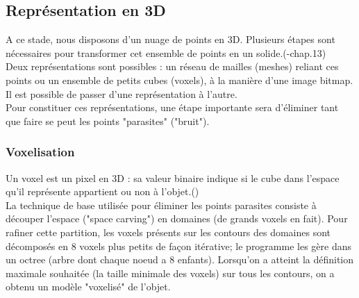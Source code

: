 \documentclass[a4paper,10pt]{report}
\begin{document}
\subsection{Représentation en 3D}
A ce stade, nous disposons d'un nuage de points en 3D. Plusieurs étapes sont nécessaires pour transformer cet ensemble de points en un solide.(\cite{shapiro}-chap.13)\\
Deux représentations sont possibles : un réseau de mailles (meshes) reliant ces points ou un ensemble de petits cubes (voxels), à la manière d'une image bitmap. Il est possible de passer d'une représentation à l'autre.\\
Pour constituer ces représentations, une étape importante sera d'éliminer tant que faire se peut les points "parasites" ("bruit").
\subsubsection{Voxelisation}
Un voxel est un pixel en 3D : sa valeur binaire indique si le cube dans l'espace qu'il représente appartient ou non à l'objet.(\cite{Voxelization,basdogan,pulli})\\
La technique de base utilisée pour éliminer les points parasites consiste à découper l'espace ("space carving") en domaines (de grands voxels en fait). Pour rafiner cette partition, les voxels présents sur les contours des domaines sont décomposés en 8 voxels plus petits de façon itérative; le programme les gère dans un octree (arbre dont chaque noeud a 8 enfants). Lorsqu'on a atteint la définition maximale souhaitée (la taille minimale des voxels) sur tous les contours, on a obtenu un modèle "voxelisé" de l'objet.
\end{document}
